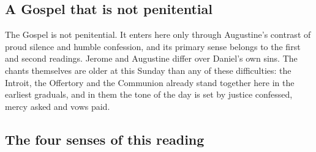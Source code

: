 \subsection{A Gospel that is not penitential}

The Gospel is not penitential. It enters here only through Augustine's
contrast of proud silence and humble confession, and its primary sense
belongs to the first and second readings. Jerome and Augustine
differ over Daniel's own sins. The chants themselves are older at this Sunday
than any of these difficulties: the Introit, the Offertory and the Communion
already stand together here in the earliest graduals, and in them the tone of
the day is set by justice confessed, mercy asked and vows paid.

\subsection{The four senses of this reading}

